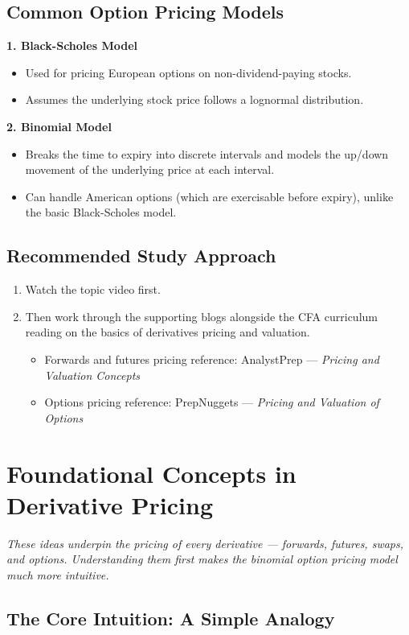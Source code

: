 \documentclass[12pt,openany]{book}
\theoremstyle{definition}
\theoremstyle{remark}
\begin{document}
\subsection{Common Option Pricing Models}

\textbf{1. Black-Scholes Model}
\begin{itemize}
\item Used for pricing European options on non-dividend-paying stocks.
\item Assumes the underlying stock price follows a lognormal distribution.
\end{itemize}
\textbf{2. Binomial Model}
\begin{itemize}
\item Breaks the time to expiry into discrete intervals and models the up/down movement of the underlying price at each interval.
\item Can handle American options (which are exercisable before expiry), unlike the basic Black-Scholes model.
\end{itemize}
\subsection{Recommended Study Approach}

\begin{enumerate}
\item Watch the topic video first.
\item Then work through the supporting blogs alongside the CFA curriculum reading on the basics of derivatives pricing and valuation.
\begin{itemize}
\item Forwards and futures pricing reference: AnalystPrep — \emph{Pricing and Valuation Concepts}
\item Options pricing reference: PrepNuggets — \emph{Pricing and Valuation of Options}
\end{itemize}
\end{enumerate}

\section{Foundational Concepts in Derivative Pricing}

\emph{These ideas underpin the pricing of every derivative — forwards, futures, swaps, and options. Understanding them first makes the binomial option pricing model much more intuitive.}

\subsection{The Core Intuition: A Simple Analogy}
\end{document}
